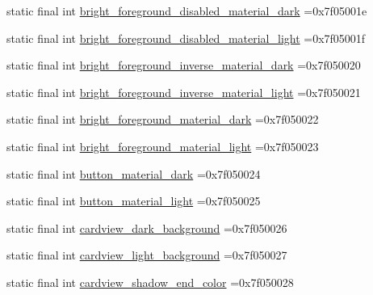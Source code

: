 \begin{DoxyCompactItemize}
\item 
static final int \mbox{\hyperlink{classbr_1_1unb_1_1cic_1_1mp_1_1marketmaster_1_1test_1_1R_1_1color_a07e332954bbc93859fb89c4fa0321adf}{bright\+\_\+foreground\+\_\+disabled\+\_\+material\+\_\+dark}} =0x7f05001e
\item 
static final int \mbox{\hyperlink{classbr_1_1unb_1_1cic_1_1mp_1_1marketmaster_1_1test_1_1R_1_1color_a49e2f8f30e5e4c34cad6b9981da365e2}{bright\+\_\+foreground\+\_\+disabled\+\_\+material\+\_\+light}} =0x7f05001f
\item 
static final int \mbox{\hyperlink{classbr_1_1unb_1_1cic_1_1mp_1_1marketmaster_1_1test_1_1R_1_1color_ab63c4ff5d62a4a2af305295a3421ec75}{bright\+\_\+foreground\+\_\+inverse\+\_\+material\+\_\+dark}} =0x7f050020
\item 
static final int \mbox{\hyperlink{classbr_1_1unb_1_1cic_1_1mp_1_1marketmaster_1_1test_1_1R_1_1color_a7c431f88be2fb9b940af1ffcece31f1a}{bright\+\_\+foreground\+\_\+inverse\+\_\+material\+\_\+light}} =0x7f050021
\item 
static final int \mbox{\hyperlink{classbr_1_1unb_1_1cic_1_1mp_1_1marketmaster_1_1test_1_1R_1_1color_abf43d407a3234b5500434bc992e73f6b}{bright\+\_\+foreground\+\_\+material\+\_\+dark}} =0x7f050022
\item 
static final int \mbox{\hyperlink{classbr_1_1unb_1_1cic_1_1mp_1_1marketmaster_1_1test_1_1R_1_1color_aa2964340dd994a8f4b8f88273adfd3e2}{bright\+\_\+foreground\+\_\+material\+\_\+light}} =0x7f050023
\item 
static final int \mbox{\hyperlink{classbr_1_1unb_1_1cic_1_1mp_1_1marketmaster_1_1test_1_1R_1_1color_a1544f570e4ce865af1e7eaa0e6dfbf06}{button\+\_\+material\+\_\+dark}} =0x7f050024
\item 
static final int \mbox{\hyperlink{classbr_1_1unb_1_1cic_1_1mp_1_1marketmaster_1_1test_1_1R_1_1color_a52c8ff9e690ecab89f2f17454ba934f4}{button\+\_\+material\+\_\+light}} =0x7f050025
\item 
static final int \mbox{\hyperlink{classbr_1_1unb_1_1cic_1_1mp_1_1marketmaster_1_1test_1_1R_1_1color_ab19a1b1b7e2a1b9fbf611772504e2a3c}{cardview\+\_\+dark\+\_\+background}} =0x7f050026
\item 
static final int \mbox{\hyperlink{classbr_1_1unb_1_1cic_1_1mp_1_1marketmaster_1_1test_1_1R_1_1color_a12183f828f168e64554db344e7ea15c1}{cardview\+\_\+light\+\_\+background}} =0x7f050027
\item 
static final int \mbox{\hyperlink{classbr_1_1unb_1_1cic_1_1mp_1_1marketmaster_1_1test_1_1R_1_1color_a4b1c39960037f9f167ab70fe790f9f1e}{cardview\+\_\+shadow\+\_\+end\+\_\+color}} =0x7f050028

\end{DoxyCompactItemize}
